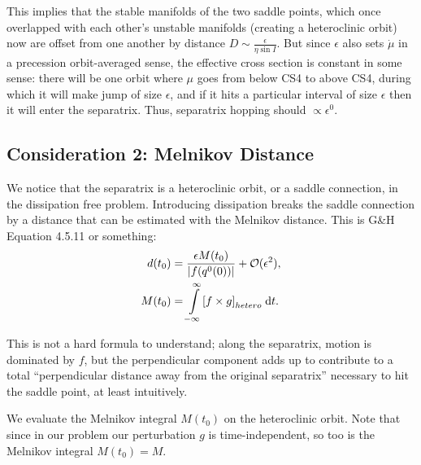 \documentclass[11pt,
        usenames, %
        dvipsnames %
    ]{article}
\DeclarePairedDelimiter\abs{\lvert}{\rvert}
\DeclarePairedDelimiter\s{\lbrack}{\rbrack}
\begin{document}
This implies that the stable manifolds of the two saddle points, which once
overlapped with each other's unstable manifolds (creating a heteroclinic orbit)
now are offset from one another by distance $D \sim \frac{\epsilon}{\eta \sin
I}$. But since $\epsilon$ also sets $\dot{\mu}$ in a precession orbit-averaged
sense, the effective cross section is constant in some sense: there will be one
orbit where $\mu$ goes from below CS4 to above CS4, during which it will make
jump of size $\epsilon$, and if it hits a particular interval of size $\epsilon$
then it will enter the separatrix. Thus, separatrix hopping should $\propto
\epsilon^0$.

\subsection{Consideration 2: Melnikov Distance}

We notice that the separatrix is a heteroclinic orbit, or a saddle connection,
in the dissipation free problem. Introducing dissipation breaks the saddle
connection by a distance that can be estimated with the Melnikov distance. This
is G\&H Equation 4.5.11 or something:
\begin{align}
    d(t_0) &= \frac{\epsilon M(t_0)}{\abs*{f(q^0(0))}} + \mathcal{O}(\epsilon^2)
        ,\\
    M(t_0) &= \int\limits_{-\infty}^\infty
        \s*{f \times g}_{hetero}\;\mathrm{d}t.
\end{align}

This is not a hard formula to understand; along the separatrix, motion is
dominated by $f$, but the perpendicular component adds up to contribute to a
total ``perpendicular distance away from the original separatrix'' necessary to
hit the saddle point, at least intuitively.

We evaluate the Melnikov integral $M(t_0)$ on the heteroclinic orbit. Note that
since in our problem our perturbation $g$ is time-independent, so too is the
Melnikov integral $M(t_0) = M$.
\end{document}
